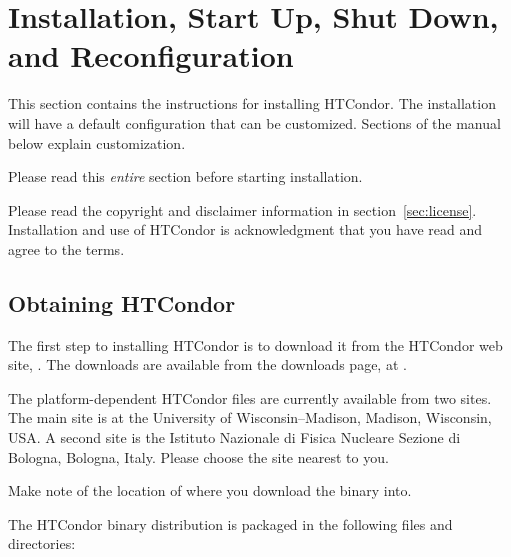 \section{\label{sec:install}Installation, Start Up, Shut Down, and Reconfiguration}

This section contains the instructions for installing HTCondor.
The installation will have a default configuration that can
be customized.
Sections of the manual below explain customization.

Please read this \emph{entire} section before starting installation.

Please read the copyright and disclaimer information in
section~\ref{sec:license}.
Installation and
use of HTCondor is acknowledgment that you have read and agree to the
terms.

\subsection{\label{sec:pre-install-procedure}
Obtaining HTCondor}
The first step to installing HTCondor is to download it from the HTCondor
web site, .
The downloads are available from the downloads page,
at .

The platform-dependent HTCondor files are currently available from two sites.
The main site is at the University of Wisconsin--Madison,
Madison, Wisconsin, USA.
A second site is the Istituto Nazionale di Fisica Nucleare Sezione di
Bologna, Bologna, Italy.
Please choose the site nearest to you.

Make note of the location of where you download the binary into.

The HTCondor binary distribution is packaged in the following files
and directories:

